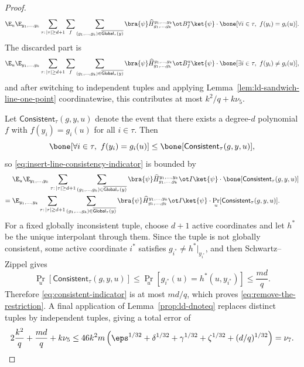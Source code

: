 \begin{proof}
\begin{equation}
		\E_u \E_{y_1,\dots,y_k} \sum_{\tau:\,|\tau|\ge d+1} \sum_f
		\sum_{(g_1,\dots,g_k)\in \overline{\mathsf{Global}_\tau(y)}}
		\bra{\psi} \widehat H_{g_1,\dots,g_k}^{y_1,\dots,y_k} \ot B_f^u \ket{\psi}
		\cdot \bone[\forall i\in\tau,\ f(y_i)=g_i(u)].
	\end{equation}
	The discarded part is
	\begin{equation}\label{eq:discarded-line-inconsistency-term}
		\E_u \E_{y_1,\dots,y_k} \sum_{\tau:\,|\tau|\ge d+1} \sum_f
		\sum_{(g_1,\dots,g_k)\in \overline{\mathsf{Global}_\tau(y)}}
		\bra{\psi} \widehat H_{g_1,\dots,g_k}^{y_1,\dots,y_k} \ot B_f^u \ket{\psi}
		\cdot \bone[\exists i\in\tau,\ f(y_i)\ne g_i(u)],
	\end{equation}
	and after switching to independent tuples and applying Lemma~\ref{lem:ld-sandwich-line-one-point} coordinatewise, this contributes at most $k^2/q + k\nu_5$.

	Let $\mathsf{Consistent}_\tau(g,y,u)$ denote the event that there exists a degree-$d$ polynomial $f$ with $f(y_i)=g_i(u)$ for all $i\in\tau$. Then
	\[
		\bone[\forall i\in\tau,\ f(y_i)=g_i(u)] \le \bone[\mathsf{Consistent}_\tau(g,y,u)],
	\]
	so \ref{eq:insert-line-consistency-indicator} is bounded by
	\begin{align}
		    & \E_u \E_{y_1,\dots,y_k} \sum_{\tau:\,|\tau|\ge d+1}
		\sum_{(g_1,\dots,g_k)\in \overline{\mathsf{Global}_\tau(y)}}
		\bra{\psi} \widehat H_{g_1,\dots,g_k}^{y_1,\dots,y_k} \ot I \ket{\psi}
		\cdot \bone[\mathsf{Consistent}_\tau(g,y,u)]\nonumber     \\
		={} &
		\E_{y_1,\dots,y_k} \sum_{\tau:\,|\tau|\ge d+1}
		\sum_{(g_1,\dots,g_k)\in \overline{\mathsf{Global}_\tau(y)}}
		\bra{\psi} \widehat H_{g_1,\dots,g_k}^{y_1,\dots,y_k} \ot I \ket{\psi}
		\cdot \Pr_u[\mathsf{Consistent}_\tau(g,y,u)].
		\label{eq:consistent-indicator}
	\end{align}
	For a fixed globally inconsistent tuple, choose $d+1$ active coordinates and let $h^*$ be the unique interpolant through them. Since the tuple is not globally consistent, some active coordinate $i^*$ satisfies $g_{i^*} \ne h^*|_{y_{i^*}}$, and then Schwartz--Zippel gives
	\[
		\Pr_u[\mathsf{Consistent}_\tau(g,y,u)]
		\le
		\Pr_u[g_{i^*}(u)=h^*(u,y_{i^*})]
		\le
		\frac{md}{q}.
	\]
	Therefore \ref{eq:consistent-indicator} is at most $md/q$, which proves \ref{eq:remove-the-restriction}. A final application of Lemma~\ref{prop:ld-dnoteq} replaces distinct tuples by independent tuples, giving a total error of
	\[
		2\frac{k^2}{q} + \frac{md}{q} + k\nu_5
		\le
		46k^2m\left(\eps^{1/32}+\delta^{1/32}+\gamma^{1/32}+\zeta^{1/32}+(d/q)^{1/32}\right)
		= \nu_7.
	\]
\end{proof}

